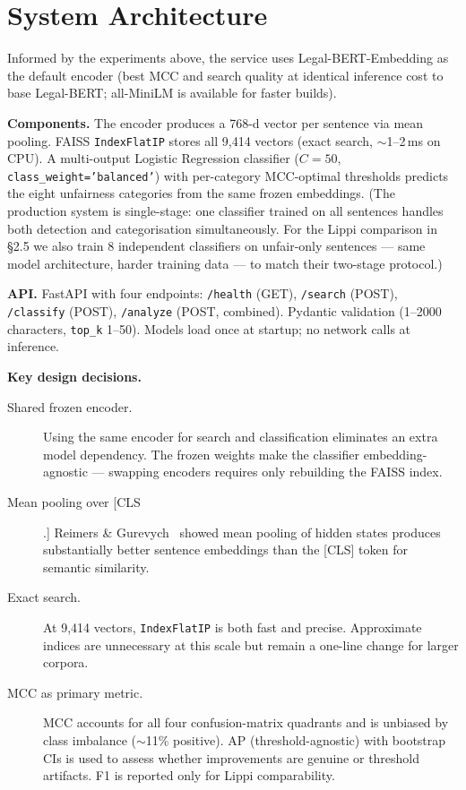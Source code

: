 \documentclass[11pt,a4paper]{article}
\begin{document}
\section{System Architecture}

Informed by the experiments above, the service uses Legal-BERT-Embedding
as the default encoder (best MCC and search quality at identical inference
cost to base Legal-BERT; all-MiniLM is available for faster builds).

\textbf{Components.}  The encoder produces a 768-d vector per sentence via
mean pooling.  FAISS \texttt{IndexFlatIP} stores all 9,414 vectors (exact
search, $\sim$1--2\,ms on CPU).  A multi-output Logistic Regression
classifier ($C=50$, \texttt{class\_weight='balanced'}) with per-category
MCC-optimal thresholds predicts the eight unfairness categories from the
same frozen embeddings.  (The production system is single-stage: one
classifier trained on all sentences handles both detection and
categorisation simultaneously.  For the Lippi comparison in \S2.5 we also
train 8 independent classifiers on unfair-only sentences --- same model
architecture, harder training data --- to match their two-stage protocol.)

\textbf{API.}  FastAPI with four endpoints: \texttt{/health} (GET),
\texttt{/search} (POST), \texttt{/classify} (POST), \texttt{/analyze}
(POST, combined).  Pydantic validation (1--2000 characters, \texttt{top\_k}
1--50).  Models load once at startup; no network calls at inference.

\textbf{Key design decisions.}

\begin{description}
\item[Shared frozen encoder.]  Using the same encoder for search and
  classification eliminates an extra model dependency.  The frozen
  weights make the classifier embedding-agnostic --- swapping encoders
  requires only rebuilding the FAISS index.
\item[Mean pooling over [CLS].]  Reimers \& Gurevych~\cite{reimers2019sbert}
  showed mean pooling of hidden states produces substantially better
  sentence embeddings than the [CLS] token for semantic similarity.
\item[Exact search.]  At 9,414 vectors, \texttt{IndexFlatIP} is both fast
  and precise.  Approximate indices are unnecessary at this scale but
  remain a one-line change for larger corpora.
\item[MCC as primary metric.]  MCC accounts for all four confusion-matrix
  quadrants and is unbiased by class imbalance ($\sim$11\% positive).
  AP (threshold-agnostic) with bootstrap CIs is used to assess whether
  improvements are genuine or threshold artifacts.  F1 is reported only
  for Lippi comparability.
\end{description}
\end{document}

